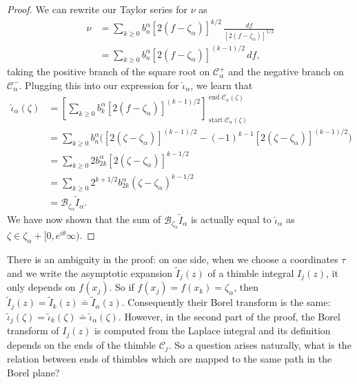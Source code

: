 \documentclass[11pt,a4paper,twoside,leqno,noamsfonts]{amsart}
\numberwithin{equation}{section}
\begin{document}
\begin{proof}
We can rewrite our Taylor series for $\nu$ as
\begin{align*}
\nu & = \sum_{k \ge 0} b_n^\alpha [2(f - \zeta_\alpha)]^{k/2}\,\frac{df}{[2(f - \zeta_\alpha)]^{1/2}} \\
& = \sum_{k \ge 0} b_n^\alpha [2(f - \zeta_\alpha)]^{(k - 1)/2}\,df,
\end{align*}
taking the positive branch of the square root on $\mathcal{C}^+_\alpha$ and the negative branch on $\mathcal{C}^-_\alpha$. Plugging this into our expression for $\hat{\iota}_\alpha$, we learn that
\begin{align*}
\hat{\iota}_\alpha(\zeta) & = \left[ \sum_{k \ge 0} b_k^\alpha [2(f - \zeta_\alpha)]^{(k - 1)/2} \right]_{\operatorname{start} \mathcal{C}_\alpha(\zeta)}^{\operatorname{end} \mathcal{C}_\alpha(\zeta)} \\
& = \sum_{k \ge 0} b_n^\alpha \Big( [2(\zeta - \zeta_\alpha)]^{(k - 1)/2} - (-1)^{k-1}[2(\zeta - \zeta_\alpha)]^{(k - 1)/2} \Big) \\
& = \sum_{k \ge 0} 2 b_{2k}^\alpha [2(\zeta - \zeta_\alpha)]^{k - 1/2} \\
& = \sum_{k \ge 0} 2^{k+1/2} b_{2k}^\alpha (\zeta - \zeta_\alpha)^{k - 1/2} \\
& = \mathcal{B}_{\zeta_\alpha} \tilde{I}_\alpha.
\end{align*}
We have now shown that the sum of $\mathcal{B}_{\zeta_\alpha} \tilde{I}_\alpha$ is actually equal to $\hat{\iota}_\alpha$ as $\zeta\in\zeta_\alpha+[0,e^{i\theta}\infty)$.
\end{proof}

\color{Aquamarine}
\begin{remark}
There is an ambiguity in the proof: on one side, when we choose a coordinates $\tau$ and we write the asymptotic expansion $\tilde{I}_j(z)$ of a thimble integral $I_j(z)$, it only depends on $f(x_j)$. So if $f(x_j)=f(x_k)=\zeta_\alpha$, then $\tilde{I}_j(z)=\tilde{I}_k(z)\doteq\tilde{I}_\alpha(z)$. Consequently their Borel transform is the same: $\tilde{\iota}_j(\zeta)=\tilde{\iota}_k(\zeta)\doteq\tilde{\iota}_\alpha(\zeta)$. However, in the second part of the proof, the Borel transform of $I_j(z)$ is computed from the Laplace integral and its definition depends on the ends of the thimble $\mathcal{C}_j$. So a question arises naturally, what is the relation between ends of thimbles which are mapped to the same path in the Borel plane? 
\end{remark}   

\color{black}
\end{document}
